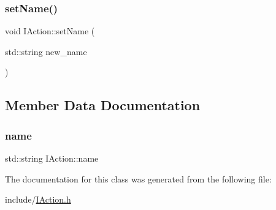 \mbox{\label{class_i_action_a4a38fa06fac69702e53abd46c2e7ae9e}} 
\subsubsection{\texorpdfstring{set\+Name()}{setName()}}
{\footnotesize\ttfamily void I\+Action\+::set\+Name (\begin{DoxyParamCaption}\item[{std\+::string}]{new\+\_\+name }\end{DoxyParamCaption})\hspace{0.3cm}{\ttfamily [inline]}}



\subsection{Member Data Documentation}
\mbox{\label{class_i_action_a384f5aba23093f729d03136abcf9d168}} 
\subsubsection{\texorpdfstring{name}{name}}
{\footnotesize\ttfamily std\+::string I\+Action\+::name\hspace{0.3cm}{\ttfamily [private]}}



The documentation for this class was generated from the following file\+:\begin{DoxyCompactItemize}
\item 
include/\mbox{\hyperlink{_i_action_8h}{I\+Action.\+h}}\end{DoxyCompactItemize}

